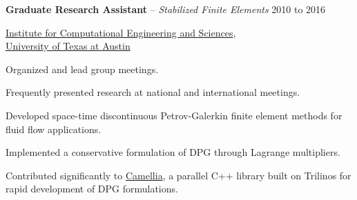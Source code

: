 \documentclass[10pt]{article}
\newenvironment{innerlist}[1][\enskip\textbullet]%
        {\begin{compactitem}[#1]}{\end{compactitem}}
\begin{document}
\textbf{Graduate Research Assistant} -- \emph{Stabilized Finite Elements} \hfill {2010 to 2016}
\begin{innerlist}

\item[] \href{http://ices.utexas.edu/}{Institute for Computational Engineering
and Sciences},\\
        \href{http://www.utexas.edu/}{University of Texas at Austin}
\begin{innerlist}
\item Organized and lead group meetings.
\item Frequently presented research at national and international meetings.
\item Developed space-time discontinuous Petrov-Galerkin finite element methods for
fluid flow applications.
\item Implemented a conservative formulation of DPG through Lagrange multipliers.
\item Contributed significantly to
\href{https://github.com/CamelliaDPG/Camellia}{Camellia}, a parallel C++ library built on Trilinos for
rapid development of DPG formulations.
\end{innerlist}
\end{innerlist}

\bigskip
\end{document}
